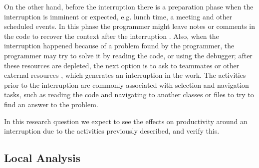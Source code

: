 \documentclass[times]{smrauth}
\newcommand\RR[1]{\textbf{Romain #1}}
\begin{document}
On the other hand, before the interruption there is a preparation phase when the interruption is imminent or expected, e.g. lunch time, a meeting and other scheduled events. In this phase the programmer might leave notes or comments in the code to recover the context after the interruption \cite{PD10}. Also, when the interruption happened because of a problem found by the programmer, the programmer may try to solve it by reading the code, or using the debugger;%
after these resources are depleted, the next option is to ask to teammates or other external resources \cite{LVD06}, which generates an interruption in the work. The activities prior to the interruption are commonly associated with selection and navigation tasks, such as reading the code and navigating to another classes or files to try to find an answer to the problem. 

In this research question we expect to see the effects on productivity around an interruption due to the activities previously described, and verify this.


\subsection{Local Analysis}
\end{document}
